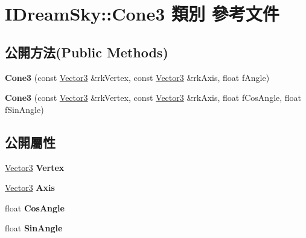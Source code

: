 \hypertarget{class_i_dream_sky_1_1_cone3}{}\section{I\+Dream\+Sky\+:\+:Cone3 類別 參考文件}
\label{class_i_dream_sky_1_1_cone3}
\subsection*{公開方法(Public Methods)}
\begin{DoxyCompactItemize}
\item 
{\bfseries Cone3} (const \hyperlink{class_i_dream_sky_1_1_vector3}{Vector3} \&rk\+Vertex, const \hyperlink{class_i_dream_sky_1_1_vector3}{Vector3} \&rk\+Axis, float f\+Angle)\hypertarget{class_i_dream_sky_1_1_cone3_a4b6edca85d4a658ba2698459362ad491}{}\label{class_i_dream_sky_1_1_cone3_a4b6edca85d4a658ba2698459362ad491}

\item 
{\bfseries Cone3} (const \hyperlink{class_i_dream_sky_1_1_vector3}{Vector3} \&rk\+Vertex, const \hyperlink{class_i_dream_sky_1_1_vector3}{Vector3} \&rk\+Axis, float f\+Cos\+Angle, float f\+Sin\+Angle)\hypertarget{class_i_dream_sky_1_1_cone3_a088079a2a4e21f45215d38e222ad44b3}{}\label{class_i_dream_sky_1_1_cone3_a088079a2a4e21f45215d38e222ad44b3}

\end{DoxyCompactItemize}
\subsection*{公開屬性}
\begin{DoxyCompactItemize}
\item 
\hyperlink{class_i_dream_sky_1_1_vector3}{Vector3} {\bfseries Vertex}\hypertarget{class_i_dream_sky_1_1_cone3_a04ae538c54f8c7e4c40e1e635d2d9669}{}\label{class_i_dream_sky_1_1_cone3_a04ae538c54f8c7e4c40e1e635d2d9669}

\item 
\hyperlink{class_i_dream_sky_1_1_vector3}{Vector3} {\bfseries Axis}\hypertarget{class_i_dream_sky_1_1_cone3_a4c3f4eb11fe60e8736195a0f471c9de4}{}\label{class_i_dream_sky_1_1_cone3_a4c3f4eb11fe60e8736195a0f471c9de4}

\item 
float {\bfseries Cos\+Angle}\hypertarget{class_i_dream_sky_1_1_cone3_af3feb49ad4349a153ee1f6f0a3c4d3a4}{}\label{class_i_dream_sky_1_1_cone3_af3feb49ad4349a153ee1f6f0a3c4d3a4}

\item 
float {\bfseries Sin\+Angle}\hypertarget{class_i_dream_sky_1_1_cone3_a1489fe51e0eba3c39c5c6c83aeb567fc}{}\label{class_i_dream_sky_1_1_cone3_a1489fe51e0eba3c39c5c6c83aeb567fc}

\end{DoxyCompactItemize}


